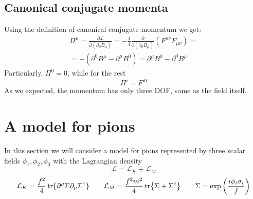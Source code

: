 \documentclass{article}
\let\breaklesssection\section
\renewcommand\section{\clearpage\breaklesssection}
\begin{document}
\subsection{Canonical conjugate momenta}
Using the definition of canonical conjugate momentum we get:
\begin{equation}
\begin{gathered}
    \Pi^\mu = \frac{\partial \mathcal{L}}{\partial (\partial_0 B_\mu)} = -\frac{1}{4} \frac{\partial}{\partial (\partial_0 B_\mu)} \left(F^{\mu\nu}F_{\mu\nu}\right) =
    \\
    = -\left(\partial^0B^\mu - \partial^\mu B^0\right) = \partial^\mu B^0 - \partial^0B^\mu
\end{gathered}
\end{equation}
Particularly, $\Pi^0 = 0$, while for the rest
\begin{equation}
    \Pi^i = F^{i0}
\end{equation}
As we expected, the momentum has only three DOF, same as the field itself.

\section{A model for pions}
In this section we will consider a model for pions represented by three scalar fields $\phi_1, \phi_2, \phi_3$ with the Lagrangian density
\begin{equation}
    \mathcal{L} = \mathcal{L}_K + \mathcal{L}_M
\end{equation}
\begin{equation}
    \mathcal{L}_K = \frac{f^2}{4}\tr\{\partial^\mu\Sigma\partial_\mu\Sigma^\dagger\}
    \qquad
    \mathcal{L}_M = \frac{f^2m^2}{4}\tr{\Sigma + \Sigma^\dagger}
    \qquad
    \Sigma = \exp\left(\frac{i\phi_i\sigma_i}{f}\right)
\end{equation}
\end{document}
